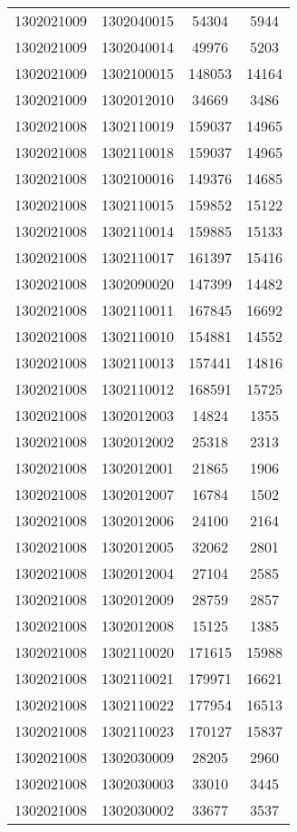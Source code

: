 \begin{longtable}[h]{llcc}
		1302021009 & 1302040015 & 54304 & 5944\\
		1302021009 & 1302040014 & 49976 & 5203\\
		1302021009 & 1302100015 & 148053 & 14164\\
		1302021009 & 1302012010 & 34669 & 3486\\
		1302021008 & 1302110019 & 159037 & 14965\\
		1302021008 & 1302110018 & 159037 & 14965\\
		1302021008 & 1302100016 & 149376 & 14685\\
		1302021008 & 1302110015 & 159852 & 15122\\
		1302021008 & 1302110014 & 159885 & 15133\\
		1302021008 & 1302110017 & 161397 & 15416\\
		1302021008 & 1302090020 & 147399 & 14482\\
		1302021008 & 1302110011 & 167845 & 16692\\
		1302021008 & 1302110010 & 154881 & 14552\\
		1302021008 & 1302110013 & 157441 & 14816\\
		1302021008 & 1302110012 & 168591 & 15725\\
		1302021008 & 1302012003 & 14824 & 1355\\
		1302021008 & 1302012002 & 25318 & 2313\\
		1302021008 & 1302012001 & 21865 & 1906\\
		1302021008 & 1302012007 & 16784 & 1502\\
		1302021008 & 1302012006 & 24100 & 2164\\
		1302021008 & 1302012005 & 32062 & 2801\\
		1302021008 & 1302012004 & 27104 & 2585\\
		1302021008 & 1302012009 & 28759 & 2857\\
		1302021008 & 1302012008 & 15125 & 1385\\
		1302021008 & 1302110020 & 171615 & 15988\\
		1302021008 & 1302110021 & 179971 & 16621\\
		1302021008 & 1302110022 & 177954 & 16513\\
		1302021008 & 1302110023 & 170127 & 15837\\
		1302021008 & 1302030009 & 28205 & 2960\\
		1302021008 & 1302030003 & 33010 & 3445\\
		1302021008 & 1302030002 & 33677 & 3537\\

\end{longtable}

